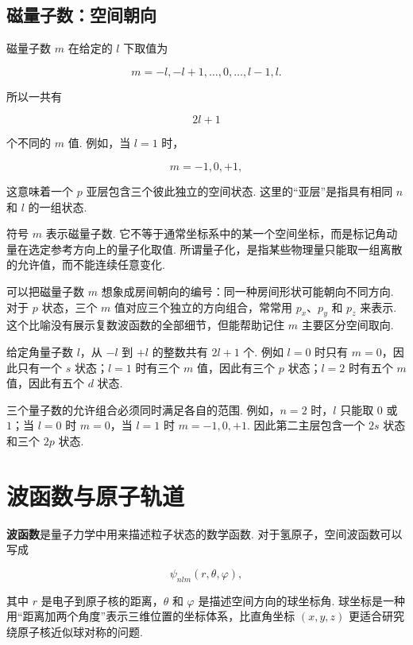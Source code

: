 \documentclass[UTF8,11pt,a4paper,openany]{ctexbook}
\newcommand{\term}[1]{\textbf{#1}}
\begin{document}
\subsection{磁量子数：空间朝向}

磁量子数 $m$ 在给定的 $l$ 下取值为

\[
m=-l,-l+1,\ldots,0,\ldots,l-1,l.
\]

所以一共有

\[
2l+1
\]

个不同的 $m$ 值. 例如，当 $l=1$ 时，

\[
m=-1,0,+1,
\]

这意味着一个 $p$ 亚层包含三个彼此独立的空间状态. 这里的“亚层”是指具有相同 $n$ 和 $l$ 的一组状态. 

\begin{notationbox}
符号 $m$ 表示磁量子数. 它不等于通常坐标系中的某一个空间坐标，而是标记角动量在选定参考方向上的量子化取值. 所谓量子化，是指某些物理量只能取一组离散的允许值，而不能连续任意变化. 
\end{notationbox}

\begin{analogybox}
可以把磁量子数 $m$ 想象成房间朝向的编号：同一种房间形状可能朝向不同方向. 对于 $p$ 状态，三个 $m$ 值对应三个独立的方向组合，常常用 $p_x$、$p_y$ 和 $p_z$ 来表示. 这个比喻没有展示复数波函数的全部细节，但能帮助记住 $m$ 主要区分空间取向. 
\end{analogybox}

\begin{derivationbox}
给定角量子数 $l$，从 $-l$ 到 $+l$ 的整数共有 $2l+1$ 个. 例如 $l=0$ 时只有 $m=0$，因此只有一个 $s$ 状态；$l=1$ 时有三个 $m$ 值，因此有三个 $p$ 状态；$l=2$ 时有五个 $m$ 值，因此有五个 $d$ 状态. 
\end{derivationbox}

三个量子数的允许组合必须同时满足各自的范围. 例如，$n=2$ 时，$l$ 只能取 $0$ 或 $1$；当 $l=0$ 时 $m=0$，当 $l=1$ 时 $m=-1,0,+1$. 因此第二主层包含一个 $2s$ 状态和三个 $2p$ 状态. 

\section{波函数与原子轨道}

\term{波函数}是量子力学中用来描述粒子状态的数学函数. 对于氢原子，空间波函数可以写成

\[
\psi_{n l m}(r,\theta,\varphi),
\]

其中 $r$ 是电子到原子核的距离，$\theta$ 和 $\varphi$ 是描述空间方向的球坐标角. 球坐标是一种用“距离加两个角度”表示三维位置的坐标体系，比直角坐标 $(x,y,z)$ 更适合研究绕原子核近似球对称的问题. 
\end{document}
